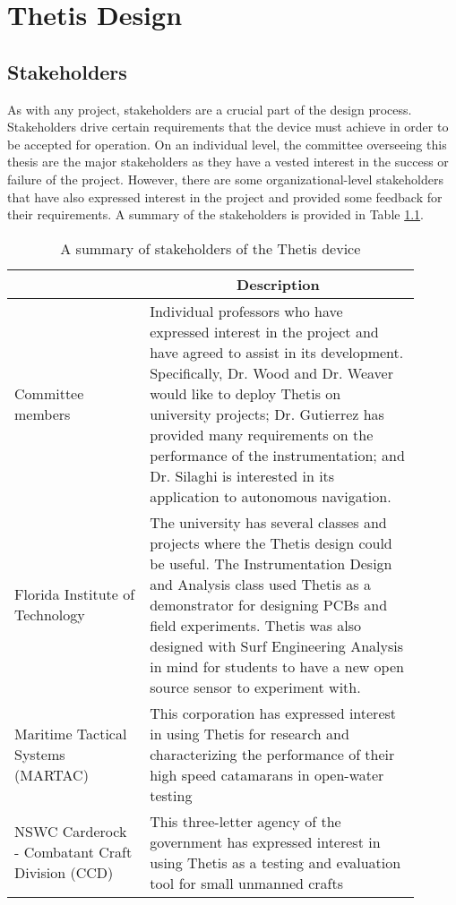 \chapter{Thetis Design} \label{chap:thetis_design}

\section{Stakeholders} \label{sec:stakeholders}
As with any project, stakeholders are a crucial part of the design process.
Stakeholders drive certain requirements that the device must achieve in order to be accepted for operation.
On an individual level, the committee overseeing this thesis are the major stakeholders as they have a vested interest in the success or failure of the project.
However, there are some organizational-level stakeholders that have also expressed interest in the project and provided some feedback for their requirements.
A summary of the stakeholders is provided in Table \ref{tab:stakeholders}.

\begin{table}
	\caption{A summary of stakeholders of the Thetis device}
	\label{tab:stakeholders}
	\centering
	\begin{tabular}{|p{0.3\linewidth} | p{0.6\linewidth}|}
		\hline
		\rowcolor[gray]{0.8}
		\multicolumn{1}{|c|}{\textbf{Stakeholder}} & \multicolumn{1}{|c|}{\textbf{Description}} \\
		\hline
		Committee members & Individual professors who have expressed interest in the project and have agreed to assist in its development. Specifically, Dr. Wood and Dr. Weaver would like to deploy Thetis on university projects; Dr. Gutierrez has provided many requirements on the performance of the instrumentation; and Dr. Silaghi is interested in its application to autonomous navigation. \\
		\hline
		Florida Institute of \newline Technology & The university has several classes and projects where the Thetis design could be useful. The Instrumentation Design and Analysis class used Thetis as a demonstrator for designing PCBs and field experiments. Thetis was also designed with Surf Engineering Analysis in mind for students to have a new open source sensor to experiment with. \\
		\hline
		Maritime Tactical \newline Systems (MARTAC) & This corporation has expressed interest in using Thetis for research and characterizing the performance of their high speed catamarans in open-water testing \\
		\hline
		NSWC Carderock - \newline Combatant Craft Division (CCD) & This three-letter agency of the government has expressed interest in using Thetis as a testing and evaluation tool for small unmanned crafts \\
		\hline
	\end{tabular}
\end{table}

